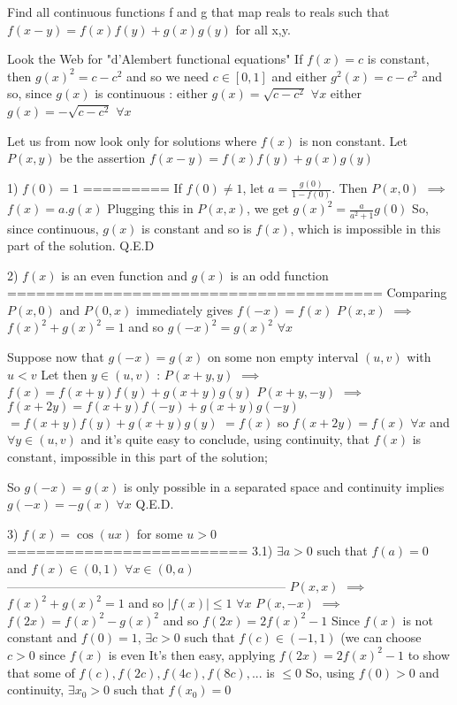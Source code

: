 \begin{solution}
	\begin{tcolorbox}Find all continuous functions f and g that map reals to reals such that $f(x-y)=f(x)f(y)+g(x)g(y)$ for all x,y.\end{tcolorbox}
Look the Web for "d'Alembert functional equations"
If $f(x)=c$ is constant, then $g(x)^2=c-c^2$ and so we need $c\in[0,1]$ and either $g^2(x)=c-c^2$ and so, since $g(x)$ is continuous :
either $g(x)=\sqrt{c-c^2}$ $\forall x$
either $g(x)=-\sqrt{c-c^2}$ $\forall x$

Let us from now look only for solutions where $f(x)$ is non constant.
Let $P(x,y)$ be the assertion $f(x-y)=f(x)f(y)+g(x)g(y)$

1) $f(0)=1$
=========
If $f(0)\ne 1$, let $a=\frac{g(0)}{1-f(0)}$. Then $P(x,0)$ $\implies$ $f(x)=a.g(x)$
Plugging this in $P(x,x)$, we get $g(x)^2=\frac a{a^2+1}g(0)$
So, since continuous, $g(x)$ is constant and so is $f(x)$, which is impossible in this part of the solution.
Q.E.D

2) $f(x)$ is an even function and $g(x)$ is an odd function
=======================================
Comparing $P(x,0)$ and $P(0,x)$ immediately gives $f(-x)=f(x)$
$P(x,x)$ $\implies$ $f(x)^2+g(x)^2=1$ and so $g(-x)^2=g(x)^2$ $\forall x$

Suppose now that $g(-x)=g(x)$ on some non empty interval $(u,v)$ with $u<v$
Let then $y\in(u,v)$ :
$P(x+y,y)$ $\implies$ $f(x)=f(x+y)f(y)+g(x+y)g(y)$
$P(x+y,-y)$ $\implies$ $f(x+2y)=f(x+y)f(-y)+g(x+y)g(-y)$ $=f(x+y)f(y)+g(x+y)g(y)$ $=f(x)$
so $f(x+2y)=f(x)$ $\forall x$ and $\forall y\in(u,v)$ and it's quite easy to conclude, using continuity, that $f(x)$ is constant, impossible in this part of the solution;

So $g(-x)=g(x)$ is only possible in a separated space and continuity implies $g(-x)=-g(x)$ $\forall x$
Q.E.D.

3) $f(x)=\cos (ux)$ for some $u>0$
=========================
3.1) $\exists a>0$ such that $f(a)=0$ and $f(x)\in(0,1)$ $\forall x\in (0,a)$
--------------------------------------------------------------------
$P(x,x)$ $\implies$ $f(x)^2+g(x)^2=1$ and so $|f(x)|\le 1$ $\forall x$
$P(x,-x)$ $\implies$ $f(2x)=f(x)^2-g(x)^2$ and so $f(2x)=2f(x)^2-1$
Since $f(x)$ is not constant and $f(0)=1$, $\exists c>0$ such that $f(c)\in (-1,1)$ (we can choose $c>0$ since $f(x)$ is even
It's then easy, applying $f(2x)=2f(x)^2-1$ to show that some of $f(c), f(2c),f(4c),f(8c),...$ is $\le 0$
So, using $f(0)>0$ and continuity, $\exists x_0>0$ such that $f(x_0)=0$ 


\end{solution}
